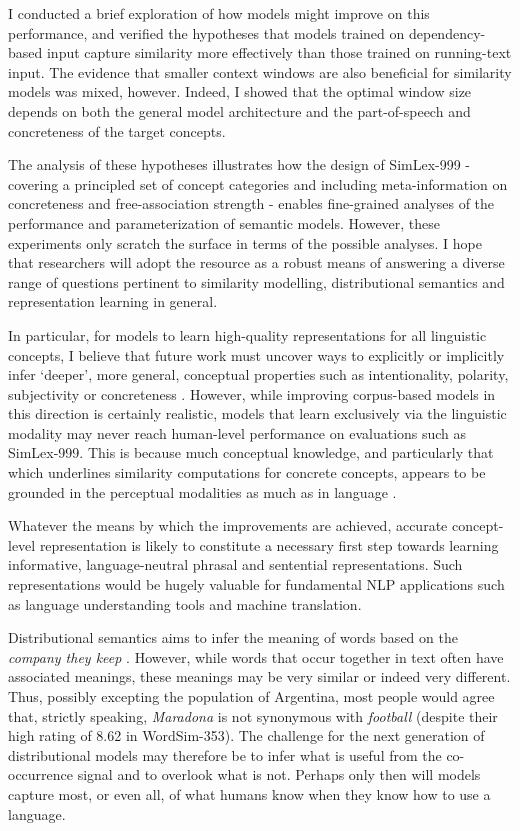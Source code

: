 I conducted a brief exploration of how models might improve on this performance, and verified the hypotheses that models trained on dependency-based input capture similarity more effectively than those trained on running-text input. The evidence that smaller context windows are also beneficial for similarity models was mixed, however. Indeed, I showed that the optimal window size depends on both the general model architecture and the part-of-speech and concreteness of the target concepts. 

The analysis of these hypotheses illustrates how the design of SimLex-999 - covering a principled set of concept categories and including meta-information on concreteness and free-association strength - enables fine-grained analyses of the performance and parameterization  of semantic models. However, these experiments only scratch the surface in terms of the possible analyses. I hope that researchers will adopt the resource as a robust means of answering a diverse range of questions pertinent to similarity modelling, distributional semantics and representation learning in general.  

In particular, for models to learn high-quality representations for all linguistic concepts, I believe that future work must uncover ways to explicitly or implicitly infer `deeper', more general, conceptual properties such as intentionality, polarity, subjectivity or concreteness \cite{gershmanmetaphor}. However, while improving corpus-based models in this direction is certainly realistic, models that learn exclusively via the linguistic modality may never reach human-level performance on evaluations such as SimLex-999. This is because much conceptual knowledge, and particularly that which underlines similarity computations for concrete concepts, appears to be grounded in the perceptual modalities as much as in language \cite{barsalou2003grounding}. 

Whatever the means by which the improvements are achieved, accurate concept-level representation is likely to constitute a necessary first step towards learning informative, language-neutral phrasal and sentential representations. Such representations would be hugely valuable for fundamental NLP applications such as language understanding tools and machine translation. 

Distributional semantics aims to infer the meaning of words based on the \emph{company they keep} \cite{dist}. However, while words that occur together in text often have associated meanings, these meanings may be very similar or indeed very different. Thus, possibly excepting the population of Argentina, most people would agree that, strictly speaking, \emph{Maradona} is not synonymous with \emph{football} (despite their high rating of 8.62 in WordSim-353). The challenge for the next generation of distributional models may therefore be to infer what is useful from the co-occurrence signal and to overlook what is not. Perhaps only then will models capture most, or even all, of what humans know when they know how to use a language. 
